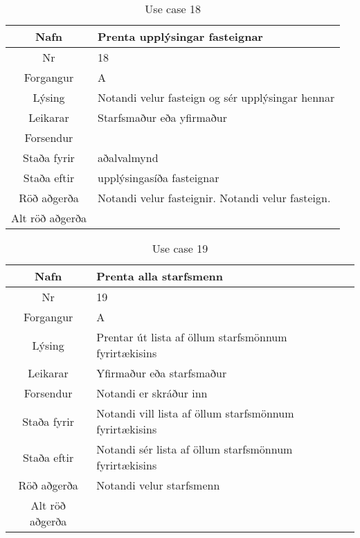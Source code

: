 \begin{table}[h!]\centering
\begin{tabular}{|c|p{10cm}|}
\hline
Nafn&Prenta upplýsingar fasteignar\\
\hline
Nr&18\\
\hline
Forgangur&A\\
\hline
Lýsing&Notandi velur fasteign og sér upplýsingar hennar\\
\hline
Leikarar&Starfsmaður eða yfirmaður\\
\hline
Forsendur&\\
\hline
Staða fyrir&aðalvalmynd\\
\hline
Staða eftir&upplýsingasíða fasteignar\\
\hline
Röð aðgerða&Notandi velur fasteignir. Notandi velur fasteign.\\
\hline
Alt röð aðgerða&\\
\hline
\end{tabular}
\caption{Use case 18}\label{tab:use_case_18}
\end{table}
\begin{table}[h!]\centering
\begin{tabular}{|c|p{10cm}|}
\hline
Nafn&Prenta alla starfsmenn\\
\hline
Nr&19\\
\hline
Forgangur&A\\
\hline
Lýsing&Prentar út lista af öllum starfsmönnum fyrirtækisins\\
\hline
Leikarar&Yfirmaður eða starfsmaður\\
\hline
Forsendur&Notandi er skráður inn\\
\hline
Staða fyrir&Notandi vill lista af öllum starfsmönnum fyrirtækisins\\
\hline
Staða eftir&Notandi sér lista af öllum starfsmönnum fyrirtækisins\\
\hline
Röð aðgerða&Notandi velur starfsmenn\\
\hline
Alt röð aðgerða&\\
\hline
\end{tabular}
\caption{Use case 19}\label{tab:use_case_19}
\end{table}
